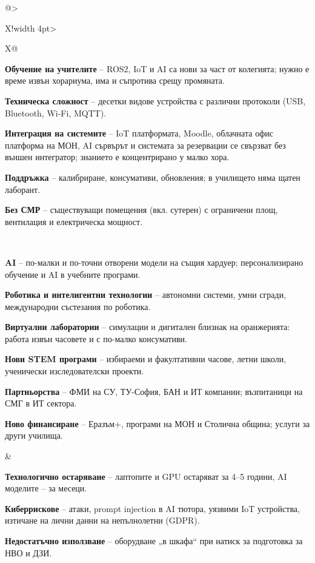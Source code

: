 \documentclass[11pt,a4paper]{article}
\begin{document}
\begin{tabularx}{\textwidth}{@{}>{\raggedright\arraybackslash}X!{\color{white}\vrule width 4pt}>{\raggedright\arraybackslash}X@{}}
\begin{swotlist}
  \item \textbf{Обучение на учителите} – ROS2, IoT и AI са нови за част от колегията; нужно е време извън хорариума, има и съпротива срещу промяната.
  \item \textbf{Техническа сложност} – десетки видове устройства с различни протоколи (USB, Bluetooth, Wi-Fi, MQTT).
  \item \textbf{Интеграция на системите} – IoT платформата, Moodle, облачната офис платформа на МОН, AI сървърът и системата за резервации се свързват без външен интегратор; знанието е концентрирано у малко хора.
  \item \textbf{Поддръжка} – калибриране, консумативи, обновления; в училището няма щатен лаборант.
  \item \textbf{Без СМР} – съществуващи помещения (вкл. сутерен) с ограничени площ, вентилация и електрическа мощност.
\end{swotlist}
\\
\noalign{\vskip 4pt}
%
\begin{swotlist}
  \item \textbf{AI} – по-малки и по-точни отворени модели на същия хардуер; персонализирано обучение и AI в учебните програми.
  \item \textbf{Роботика и интелигентни технологии} – автономни системи, умни сгради, международни състезания по роботика.
  \item \textbf{Виртуални лаборатории} – симулации и дигитален близнак на оранжерията: работа извън часовете и с по-малко консумативи.
  \item \textbf{Нови STEM програми} – избираеми и факултативни часове, летни школи, ученически изследователски проекти.
  \item \textbf{Партньорства} – ФМИ на СУ, ТУ-София, БАН и ИТ компании; възпитаници на СМГ в ИТ сектора.
  \item \textbf{Ново финансиране} – Еразъм+, програми на МОН и Столична община; услуги за други училища.
\end{swotlist}
&
%
\begin{swotlist}
  \item \textbf{Технологично остаряване} – лаптопите и GPU остаряват за 4–5 години, AI моделите – за месеци.
  \item \textbf{Киберрискове} – атаки, prompt injection в AI тютора, уязвими IoT устройства, изтичане на лични данни на непълнолетни (GDPR).
  \item \textbf{Недостатъчно използване} – оборудване „в шкафа“ при натиск за подготовка за НВО и ДЗИ.

\end{swotlist}
\end{tabularx}
\end{document}
